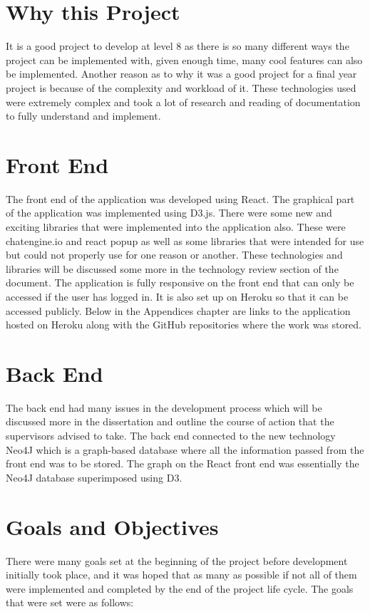 \section{Why this Project}
It is a good project to develop at level 8 as there is so many different ways the project can be implemented with, given enough time, many cool features can also be implemented. Another reason as to why it was a good project for a final year project is because of the complexity and workload of it. These technologies used were extremely complex and took a lot of research and reading of documentation to fully understand and implement. 

\section{Front End}
The front end of the application was developed using React.\cite{AngularvsReact} The graphical part of the application was implemented using D3.js.\cite{D3.js} There were some new and exciting libraries that were implemented into the application also. These were chatengine.io\cite{Chatengine} and react popup\cite{popup} as well as some libraries that were intended for use but could not properly use for one reason or another. These technologies and libraries will be discussed some more in the technology review section of the document. The application is fully responsive on the front end that can only be accessed if the user has logged in. It is also set up on Heroku so that it can be accessed publicly. Below in the Appendices chapter are links to the application hosted on Heroku along with the GitHub repositories where the work was stored. 

\section{Back End}
The back end had many issues in the development process which will be discussed more in the dissertation and outline the course of action that the supervisors advised to take. The back end connected to the new technology Neo4J\cite{Neo4J} which is a graph-based database where all the information passed from the front end was to be stored. The graph on the React front end was essentially the Neo4J database superimposed using D3. 

\section{Goals and Objectives}
There were many goals set at the beginning of the project before development initially took place, and it was hoped that as many as possible if not all of them were implemented and completed by the end of the project life cycle. The goals that were set were as follows: 


